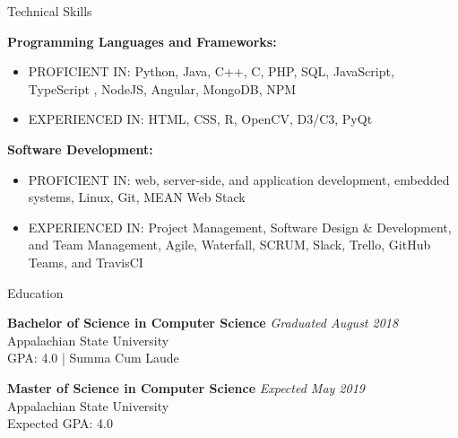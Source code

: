 \documentclass{resume} %
\begin{document}





\begin{rSection}{Technical Skills}

{\bf Programming Languages and Frameworks:}
\begin{itemize}
    \item PROFICIENT IN: Python, Java, C++, C, PHP, SQL, JavaScript, TypeScript , NodeJS, Angular, MongoDB, NPM
    \item EXPERIENCED IN: HTML, CSS, R, OpenCV, D3/C3, PyQt
\end{itemize}
{\bf Software Development:}
\begin{itemize}
    \item PROFICIENT IN: web, server-side, and application development, embedded systems, Linux, Git, MEAN Web Stack
    \item EXPERIENCED IN: Project Management, Software Design \& Development, and Team Management, Agile, Waterfall, SCRUM, Slack, Trello, GitHub Teams, and TravisCI
\end{itemize}
\end{rSection}


\begin{rSection}{Education}

{\bf Bachelor of Science in Computer Science} \hfill {\em Graduated August 2018} 
\\ Appalachian State University
\\ GPA: 4.0 | Summa Cum Laude

{\bf Master of Science in Computer Science} \hfill {\em Expected May 2019} 
\\ Appalachian State University
\\ Expected GPA: 4.0

\end{rSection}
\end{document}
